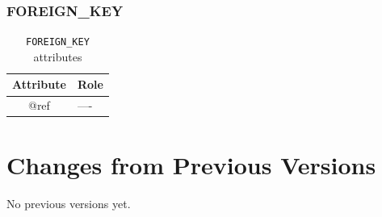 \documentclass[11pt,a4paper]{ivoa}
\begin{document}
\FloatBarrier

\subsubsection{FOREIGN\_KEY}

\begin{table}[!htbp]
\small
\centering
\begin{tabulary}{\linewidth}{|c|J|}       
       \hline 
            \textbf{Attribute} & 
            \textbf {Role}\\
       \hline         \hline  
             @ref& 
            ---- \\
     \end{tabulary}
     \caption{\texttt{FOREIGN\_KEY} attributes} 
     \label{tbl:foreignkey-att}
 \end{table}

\FloatBarrier




\section{Changes from Previous Versions}

No previous versions yet.  



\end{document}
